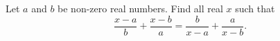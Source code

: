 Let $a$ and $b$ be non-zero real numbers. Find all real $x$ such that
\[
\dfrac{x-a}{b}+\dfrac{x-b}{a}=\dfrac{b}{x-a}+\dfrac{a}{x-b}.
\]
